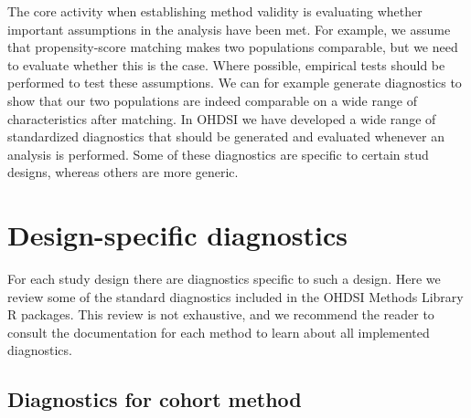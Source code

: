 \documentclass[]{book}
\begin{document}
The core activity when establishing method validity is evaluating
whether important assumptions in the analysis have been met. For
example, we assume that propensity-score matching makes two populations
comparable, but we need to evaluate whether this is the case. Where
possible, empirical tests should be performed to test these assumptions.
We can for example generate diagnostics to show that our two populations
are indeed comparable on a wide range of characteristics after matching.
In OHDSI we have developed a wide range of standardized diagnostics that
should be generated and evaluated whenever an analysis is performed.
Some of these diagnostics are specific to certain stud designs, whereas
others are more generic.

\section{Design-specific diagnostics}\label{design-specific-diagnostics}

For each study design there are diagnostics specific to such a design.
Here we review some of the standard diagnostics included in the OHDSI
Methods Library R packages. This review is not exhaustive, and we
recommend the reader to consult the documentation for each method to
learn about all implemented diagnostics.

\subsection{Diagnostics for cohort
method}\label{diagnostics-for-cohort-method}
\end{document}
